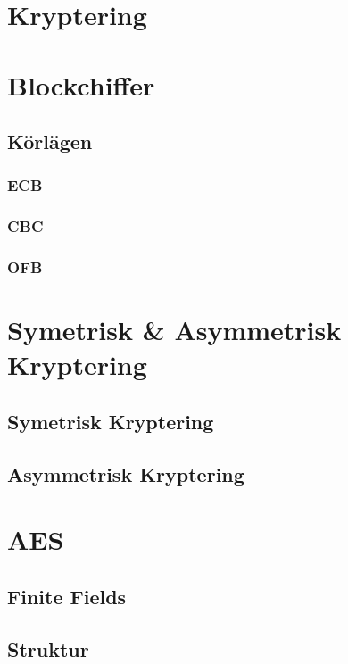 

\section{Kryptering}


\section{Blockchiffer}


\subsection{Körlägen}


\subsubsection{ECB}


\subsubsection{CBC}


\subsubsection{OFB}


\section{Symetrisk \& Asymmetrisk Kryptering}


\subsection{Symetrisk Kryptering}


\subsection{Asymmetrisk Kryptering}


\section{AES}


\subsection{Finite Fields}


\subsection{Struktur}


